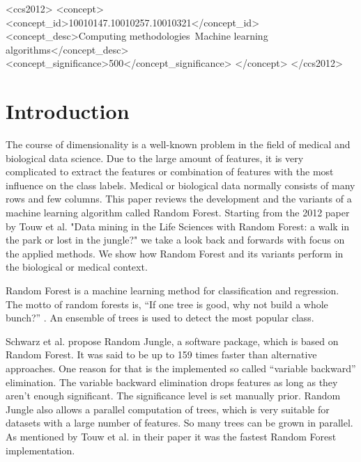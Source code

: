 \documentclass{sig-alternate-05-2015}
\begin{document}
%
%
\begin{CCSXML}
<ccs2012>
<concept>
<concept_id>10010147.10010257.10010321</concept_id>
<concept_desc>Computing methodologies~Machine learning algorithms</concept_desc>
<concept_significance>500</concept_significance>
</concept>
</ccs2012>  
\end{CCSXML}




%
%

%
%
\printccsdesc



\section{Introduction}
The course of dimensionality is a well-known problem in the field of medical and biological data science. Due to the large amount of features, it is very complicated to extract the features or combination of features with the most influence on the class labels. Medical or biological data normally consists of many rows and few columns. This paper reviews the development and the variants of a machine learning algorithm called Random Forest. Starting from the 2012 paper by Touw et al. "Data mining in the Life Sciences with Random Forest: a walk in the park or lost in the jungle?" \cite{touw2012data} we take a look back and forwards with focus on the applied methods. We show how Random Forest and its variants perform in the biological or medical context.

Random Forest \cite{breiman2001random} is a machine learning method for classification and regression. The motto of random forests is, ``If one tree is good, why not build a whole bunch?'' \cite{Robillard:recomm_sys_sw_eng}. An ensemble of trees is used to detect the most popular class.

Schwarz et al. \cite{schwarz2010safari} propose Random Jungle, a software package, which is based on Random Forest. It was said to be up to 159 times faster than alternative approaches. One reason for that is the implemented so called ``variable backward'' elimination. The variable backward elimination drops features as long as they aren't enough significant. The significance level is set manually prior.  Random Jungle also allows a parallel computation of trees, which is very suitable for datasets with a large number of features. So many trees can be grown in parallel. As mentioned by Touw et al. in their paper it was the fastest Random Forest implementation. 
\end{document}
